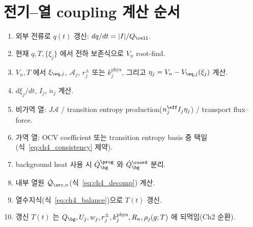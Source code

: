 \section{전기--열 coupling 계산 순서}\label{sec:ch4_order}
\begin{enumerate}[label=\arabic*),leftmargin=2.0em]
\item 외부 전류로 $q(t)$ 갱신: $dq/dt=|I|/Q_\cell$.
\item 현재 $q,T,\{\xi_j\}$ 에서 전하 보존식으로 $V_n$ root-find.
\item $V_n,T$ 에서 $\xi_{\eq,j}$, $\mathcal A_j$, $r_j^\pm$ 또는 $k_j^{\mathrm{phys}}$, 그리고 $\eta_j=V_n-V_{\eq,j}(\xi_j)$ 계산.
\item $d\xi_j/dt$, $I_j$, $\dot n_j$ 계산.
\item 비가역 열: $J\mathcal A$ / transition entropy production($n_j^{\eff}I_j\eta_j$) / transport flux--force.
\item 가역 열: OCV coefficient 또는 transition entropy basis 중 택일(식~\eqref{eq:ch4_consistency} 제약).
\item background heat 사용 시 $\dot Q_\bg^{\prog}$ 와 $\dot Q_\bg^{\coord}$ 분리.
\item 내부 열원 $\dot{\mathcal Q}_{\src,n}$(식~\eqref{eq:ch4_decomp}) 계산.
\item 열수지식(식~\eqref{eq:ch4_balance})으로 $T(t)$ 갱신.
\item 갱신 $T(t)$ 는 $Q_\bg,U_j,w_j,r_j^\pm,k_j^{\mathrm{phys}},R_n,\rho_j(g;T)$ 에 되먹임(Ch2 순환).
\end{enumerate}

